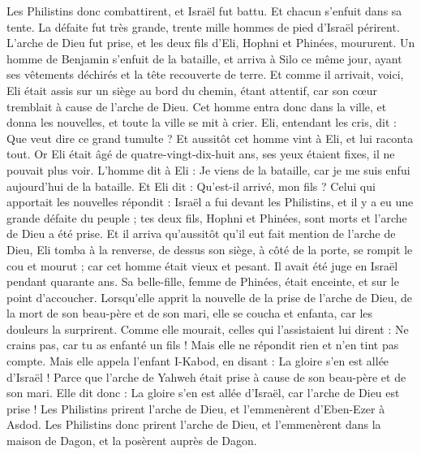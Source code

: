 \begin{multicols}{2}
Les Philistins donc combattirent, et Israël fut battu. Et chacun s'enfuit dans sa tente. La défaite fut très grande, trente mille hommes de pied d'Israël périrent.
L'arche de Dieu fut prise, et les deux fils d'Eli, Hophni et Phinées, moururent.
Un homme de Benjamin s'enfuit de la bataille, et arriva à Silo ce même jour, ayant ses vêtements déchirés et la tête recouverte de terre.
Et comme il arrivait, voici, Eli était assis sur un siège au bord du chemin, étant attentif, car son cœur tremblait à cause de l'arche de Dieu. Cet homme entra donc dans la ville, et donna les nouvelles, et toute la ville se mit à crier.
Eli, entendant les cris, dit : Que veut dire ce grand tumulte ? Et aussitôt cet homme vint à Eli, et lui raconta tout.
Or Eli était âgé de quatre-vingt-dix-huit ans, ses yeux étaient fixes, il ne pouvait plus voir.
L'homme dit à Eli : Je viens de la bataille, car je me suis enfui aujourd'hui de la bataille. Et Eli dit : Qu'est-il arrivé, mon fils ?
Celui qui apportait les nouvelles répondit : Israël a fui devant les Philistins, et il y a eu une grande défaite du peuple ; tes deux fils, Hophni et Phinées, sont morts et l'arche de Dieu a été prise.
Et il arriva qu'aussitôt qu'il eut fait mention de l'arche de Dieu, Eli tomba à la renverse, de dessus son siège, à côté de la porte, se rompit le cou et mourut ; car cet homme était vieux et pesant. Il avait été juge en Israël pendant quarante ans.
Sa belle-fille, femme de Phinées, était enceinte, et sur le point d'accoucher. Lorsqu'elle apprit la nouvelle de la prise de l'arche de Dieu, de la mort de son beau-père et de son mari, elle se coucha et enfanta, car les douleurs la surprirent.
Comme elle mourait, celles qui l'assistaient lui dirent : Ne crains pas, car tu as enfanté un fils ! Mais elle ne répondit rien et n'en tint pas compte.
Mais elle appela l'enfant I-Kabod, en disant : La gloire s'en est allée d'Israël ! Parce que l'arche de Yahweh était prise à cause de son beau-père et de son mari.
Elle dit donc : La gloire s'en est allée d'Israël, car l'arche de Dieu est prise !
\VerseOne{}Les Philistins prirent l'arche de Dieu, et l'emmenèrent d'Eben-Ezer à Asdod.
Les Philistins donc prirent l'arche de Dieu, et l'emmenèrent dans la maison de Dagon, et la posèrent auprès de Dagon.

\end{multicols}

